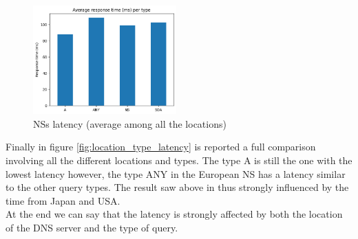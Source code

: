 \documentclass[a4paper,10pt]{article}
\begin{document}
\begin{multicols}{2}
        \begin{figure}[H]
                \centering
                \includegraphics[width=0.49\textwidth]{type_latency.png}
                \caption{\small NSs latency (average among all the locations)}
                \label{fig:type_latency}
        \end{figure}
\noindent
Finally in figure \ref{fig:location_type_latency} is reported a full comparison involving all the different locations and types. The type A is still the one with the lowest latency
however, the type ANY in the European NS has a latency similar to the other query types. The result saw above in thus strongly influenced by the time from Japan and USA.\\
At the end we can say that the latency is strongly affected by both the location of the DNS server and the type of query.\\


\end{multicols}
\end{document}
